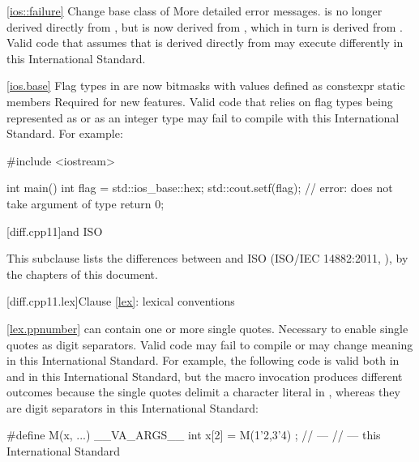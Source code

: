 \ref{ios::failure}
\change Change base class of 
\rationale More detailed error messages.
\effect
{} is no longer derived directly from
, but is now derived from ,
which in turn is derived from . Valid \CppIII code
that assumes that  is derived directly from
 may execute differently in this International Standard.

\ref{ios.base}
\change Flag types in  are now bitmasks with values
defined as constexpr static members
\rationale Required for new features.
\effect
Valid \CppIII code that relies on  flag types being
represented as  or as an integer type may fail to compile
with this International Standard. For example:

\begin{codeblock}
#include <iostream>

int main() {
  int flag = std::ios_base::hex;
  std::cout.setf(flag);         // error:  does not take argument of type 
  return 0;
}
\end{codeblock}

[diff.cpp11]{\Cpp and ISO \CppXI}

\pnum
{}%
This subclause lists the differences between \Cpp and
ISO \CppXI (ISO/IEC 14882:2011, ),
by the chapters of this document.

[diff.cpp11.lex]{Clause \ref{lex}: lexical conventions}

\ref{lex.ppnumber}
\change {} can contain one or more single quotes.
\rationale Necessary to enable single quotes as digit separators.
\effect Valid \CppXI code may fail to compile or may change meaning in this
International Standard. For example, the following code is valid both in \CppXI and in
this International Standard, but the macro invocation produces different outcomes
because the single quotes delimit a character literal in \CppXI, whereas they are digit
separators in this International Standard:

\begin{codeblock}
#define M(x, ...) __VA_ARGS__
int x[2] = { M(1'2,3'4) };
//  --- \CppXI
//  --- this International Standard
\end{codeblock}

